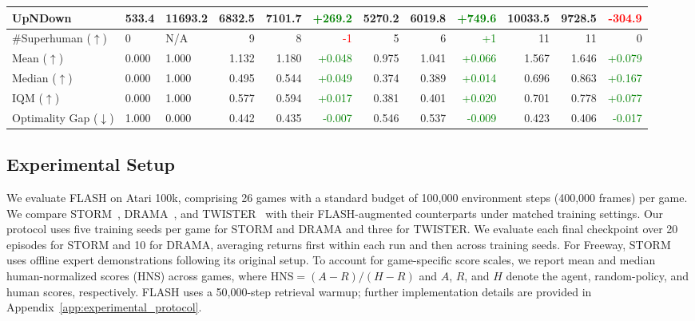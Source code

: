 \documentclass{article} %
\begin{document}
\begin{table}[!t]
{\begin{tabular}{@{}lllrrrrrrrrr@{}}
UpNDown & 533.4 & 11693.2 & 6832.5 & 7101.7 & \textcolor{green}{+269.2} & 5270.2 & 6019.8 & \textcolor{green}{+749.6} & 10033.5 & 9728.5 & \textcolor{red}{-304.9} \\
\midrule
\#Superhuman ($\uparrow$) & 0 & N/A & 9 & 8 & \textcolor{red}{-1} & 5 & 6 & \textcolor{green}{+1} & 11 & 11 & 0 \\
Mean ($\uparrow$) & 0.000 & 1.000 & 1.132 & 1.180 & \textcolor{green}{+0.048} & 0.975 & 1.041 & \textcolor{green}{+0.066} & 1.567 & 1.646 & \textcolor{green}{+0.079} \\
Median ($\uparrow$) & 0.000 & 1.000 & 0.495 & 0.544 & \textcolor{green}{+0.049} & 0.374 & 0.389 & \textcolor{green}{+0.014} & 0.696 & 0.863 & \textcolor{green}{+0.167} \\
IQM ($\uparrow$) & 0.000 & 1.000 & 0.577 & 0.594 & \textcolor{green}{+0.017} & 0.381 & 0.401 & \textcolor{green}{+0.020} & 0.701 & 0.778 & \textcolor{green}{+0.077} \\
Optimality Gap ($\downarrow$) & 1.000 & 0.000 & 0.442 & 0.435 & \textcolor{green}{-0.007} & 0.546 & 0.537 & \textcolor{green}{-0.009} & 0.423 & 0.406 & \textcolor{green}{-0.017} \\
\bottomrule
\end{tabular}
}
\vspace{-2mm}
\end{table}



\subsection{Experimental Setup}
\label{subsec:experimental_setup}
We evaluate FLASH on Atari 100k, comprising 26 games with a standard budget of 100,000 environment steps (400,000 frames) per game. We compare STORM~\citep{zhang2023storm}, DRAMA~\citep{wang2025drama}, and TWISTER~\citep{burchi2025learning} with their FLASH-augmented counterparts under matched training settings. Our protocol uses five training seeds per game for STORM and DRAMA and three for TWISTER. We evaluate each final checkpoint over 20 episodes for STORM and 10 for DRAMA, averaging returns first within each run and then across training seeds. For Freeway, STORM uses offline expert demonstrations following its original setup. To account for game-specific score scales, we report mean and median human-normalized scores (HNS) across games, where $\mathrm{HNS}=(A-R)/(H-R)$ and $A$, $R$, and $H$ denote the agent, random-policy, and human scores, respectively. FLASH uses a 50,000-step retrieval warmup; further implementation details are provided in Appendix~\ref{app:experimental_protocol}.
\end{document}
